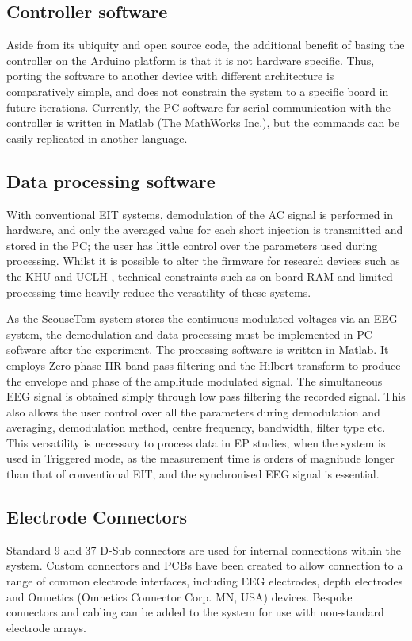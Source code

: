 \subsection{Controller software}

Aside from its ubiquity and open source code, the additional benefit of basing the controller on the Arduino platform is that it is not hardware specific. Thus, porting the software to another device with different architecture is comparatively simple, and does not constrain the system to a specific board in future iterations. Currently, the PC software for serial communication with the controller is written in Matlab (The MathWorks Inc.), but the commands can be easily replicated in another language.

\subsection{Data processing software}

With conventional EIT systems, demodulation of the AC signal is performed in hardware, and only the averaged value for each short injection is transmitted and stored in the PC; the user has little control over the parameters used during processing. Whilst it is possible to alter the firmware for research devices such as the KHU \cite{Hun_Wi_2014} and UCLH \cite{McEwan_2006}, technical constraints such as on-board RAM and limited processing time heavily reduce the versatility of these systems. 

As the ScouseTom system stores the continuous modulated voltages via an EEG system, the demodulation and data processing must be implemented in PC software after the experiment. The processing software is written in Matlab. It employs Zero-phase IIR band pass filtering and the Hilbert transform to produce the envelope and phase of the amplitude modulated signal. The simultaneous EEG signal is obtained simply through low pass filtering the recorded signal. This also allows the user control over all the parameters during demodulation and averaging, demodulation method, centre frequency, bandwidth, filter type etc. This versatility is necessary to process data in EP studies, when the system is used in Triggered mode, as the measurement time is orders of magnitude longer than that of conventional EIT, and the synchronised EEG signal is essential. 

\subsection{Electrode Connectors}

Standard 9 and 37 D-Sub connectors are used for internal connections within the system. Custom connectors and PCBs have been created to allow connection to a range of common electrode interfaces, including EEG electrodes, depth electrodes and Omnetics (Omnetics Connector Corp. MN, USA) devices. Bespoke connectors and cabling can be added to the system for use with non-standard electrode arrays.
